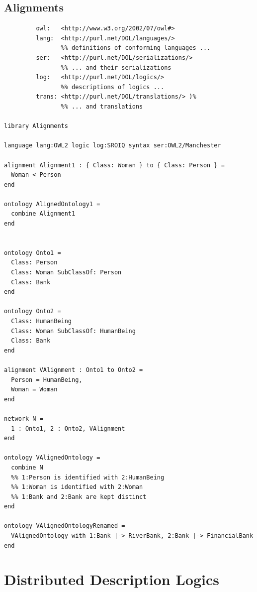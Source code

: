 \documentclass[10pt,fleqn,final]{scrreprt}
\newcommand{\sclause}[1]{\section{#1}}
\newcommand{\ssclause}[1]{\subsection{#1}}
\begin{document}
\ssclause{Alignments}
\begin{lstlisting}[basicstyle=\ttfamily,language=dolText,morekeywords={props,ObjectProperty,Class,DisjointUnionOf,SubClassOf,Characteristics,Transitive,Asymmetric,SubPropertyOf,DisjointClasses,EquivalentTo,inverse,only,forall,iff,if,or,exists,distributed},escapechar=@,mathescape]
%prefix( :      <http://www.example.org/alignment#>
         owl:   <http://www.w3.org/2002/07/owl#>
         lang:  <http://purl.net/DOL/languages/>
                %% definitions of conforming languages ...
         ser:   <http://purl.net/DOL/serializations/>
                %% ... and their serializations
         log:   <http://purl.net/DOL/logics/>
                %% descriptions of logics ...
         trans: <http://purl.net/DOL/translations/> )%
                %% ... and translations

library Alignments

language lang:OWL2 logic log:SROIQ syntax ser:OWL2/Manchester

alignment Alignment1 : { Class: Woman } to { Class: Person } =
  Woman < Person
end

ontology AlignedOntology1 =
  combine Alignment1
end


ontology Onto1 =
  Class: Person
  Class: Woman SubClassOf: Person
  Class: Bank
end

ontology Onto2 =
  Class: HumanBeing
  Class: Woman SubClassOf: HumanBeing
  Class: Bank
end

alignment VAlignment : Onto1 to Onto2 =
  Person = HumanBeing,
  Woman = Woman
end

network N =
  1 : Onto1, 2 : Onto2, VAlignment
end
 
ontology VAlignedOntology =
  combine N
  %% 1:Person is identified with 2:HumanBeing
  %% 1:Woman is identified with 2:Woman
  %% 1:Bank and 2:Bank are kept distinct
end

ontology VAlignedOntologyRenamed =
  VAlignedOntology with 1:Bank |-> RiverBank, 2:Bank |-> FinancialBank
end

\end{lstlisting}


\sclause{Distributed Description Logics}
\end{document}
